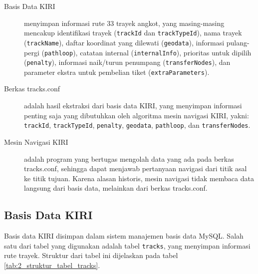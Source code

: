 \begin{description}
	\item[Basis Data KIRI] menyimpan informasi rute 33 trayek angkot, yang masing-masing mencakup identifikasi trayek (\verb/trackId/ dan \verb/trackTypeId/), nama trayek (\verb/trackName/), daftar koordinat yang dilewati (\verb/geodata/), informasi pulang-pergi (\verb/pathloop/), catatan internal (\verb/internalInfo/), prioritas untuk dipilih (\verb/penalty/), informasi naik/turun penumpang (\verb/transferNodes/), dan parameter ekstra untuk pembelian tiket (\verb/extraParameters/).
	\item[Berkas tracks.conf] adalah hasil ekstraksi dari basis data KIRI, yang menyimpan informasi penting saja yang dibutuhkan oleh algoritma mesin navigasi KIRI, yakni: \verb/trackId/, \verb/trackTypeId/, \verb/penalty/, \verb/geodata/, \verb/pathloop/, dan \verb/transferNodes/.
	\item[Mesin Navigasi KIRI] adalah program yang bertugas mengolah data yang ada pada berkas tracks.conf, sehingga dapat menjawab pertanyaan navigasi dari titik asal ke titik tujuan. Karena alasan historis, mesin navigasi tidak membaca data langsung dari basis data, melainkan dari berkas tracks.conf.
\end{description}

\subsection{Basis Data KIRI}
Basis data KIRI disimpan dalam sistem manajemen basis data MySQL. Salah satu dari tabel yang digunakan adalah tabel \verb/tracks/, yang menyimpan informasi rute trayek. Struktur dari tabel ini dijelaskan pada tabel \ref{tab:2_struktur_tabel_tracks}.

